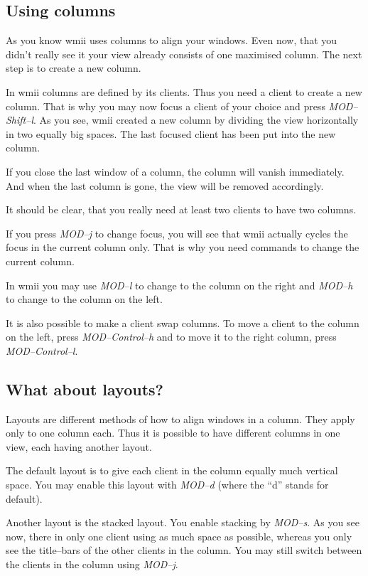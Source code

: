 \documentclass[12pt,a4paper]{article} %
\begin{document}
  \subsection{Using columns}

    As you know wmii uses columns to align your windows. Even now,
    that you didn't really see it your view already consists of one
    maximised column. The next step is to create a new column.

    In wmii columns are defined by its clients. Thus you need a client
    to create a new column. That is why you may now focus a client of
    your choice and press \emph{MOD--Shift--l}. As you see, wmii created
    a new column by dividing the view horizontally in two equally big
    spaces. The last focused client has been put into the new column.

    If you close the last window of a column, the column will vanish
    immediately. And when the last column is gone, the view will be
    removed accordingly.

    It should be clear, that you really need at least two clients to
    have two columns.

    If you press \emph{MOD--j} to change focus, you will see that wmii
    actually cycles the focus in the current column only. That is why
    you need commands to change the current column.

    In wmii you may use \emph{MOD--l} to change to the column on the
    right and \emph{MOD--h} to change to the column on the left.

    It is also possible to make a client swap columns. To move a
    client to the column on the left, press \emph{MOD--Control--h} and
    to move it to the right column, press \emph{MOD--Control--l}.

  \subsection{What about layouts?}

    Layouts are different methods of how to align windows in a
    column. They apply only to one column each. Thus it is possible to
    have different columns in one view, each having another layout.

    The default layout is to give each client in the column equally
    much vertical space. You may enable this layout with \emph{MOD--d}
    (where the ``d'' stands for default).

    Another layout is the stacked layout. You enable stacking by
    \emph{MOD--s}. As you see now, there in only one client using as
    much space as possible, whereas you only see the title--bars of the
    other clients in the column. You may still switch between the
    clients in the column using \emph{MOD--j}.
\end{document}
